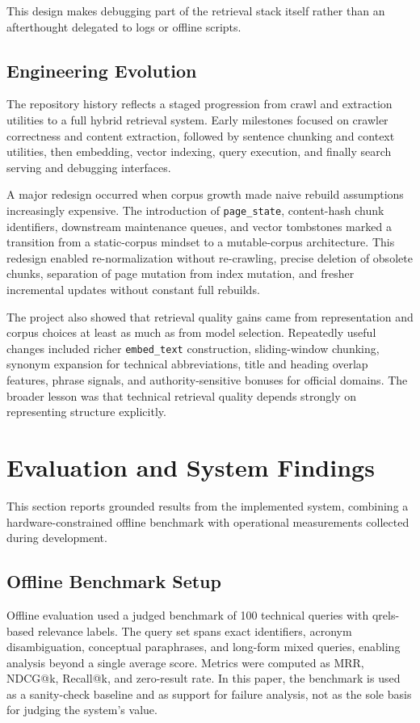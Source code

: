 \documentclass[conference]{IEEEtran}
\begin{document}
This design makes debugging part of the retrieval stack itself rather than an afterthought delegated to logs or offline scripts.

\subsection{Engineering Evolution}
The repository history reflects a staged progression from crawl and extraction utilities to a full hybrid retrieval system. Early milestones focused on crawler correctness and content extraction, followed by sentence chunking and context utilities, then embedding, vector indexing, query execution, and finally search serving and debugging interfaces.

A major redesign occurred when corpus growth made naive rebuild assumptions increasingly expensive. The introduction of \texttt{page\_state}, content-hash chunk identifiers, downstream maintenance queues, and vector tombstones marked a transition from a static-corpus mindset to a mutable-corpus architecture. This redesign enabled re-normalization without re-crawling, precise deletion of obsolete chunks, separation of page mutation from index mutation, and fresher incremental updates without constant full rebuilds.

The project also showed that retrieval quality gains came from representation and corpus choices at least as much as from model selection. Repeatedly useful changes included richer \texttt{embed\_text} construction, sliding-window chunking, synonym expansion for technical abbreviations, title and heading overlap features, phrase signals, and authority-sensitive bonuses for official domains. The broader lesson was that technical retrieval quality depends strongly on representing structure explicitly.

\section{Evaluation and System Findings}
This section reports grounded results from the implemented system, combining a hardware-constrained offline benchmark with operational measurements collected during development.

\subsection{Offline Benchmark Setup}
Offline evaluation used a judged benchmark of 100 technical queries with qrels-based relevance labels. The query set spans exact identifiers, acronym disambiguation, conceptual paraphrases, and long-form mixed queries, enabling analysis beyond a single average score. Metrics were computed as MRR, NDCG@k, Recall@k, and zero-result rate. In this paper, the benchmark is used as a sanity-check baseline and as support for failure analysis, not as the sole basis for judging the system's value.
\end{document}
